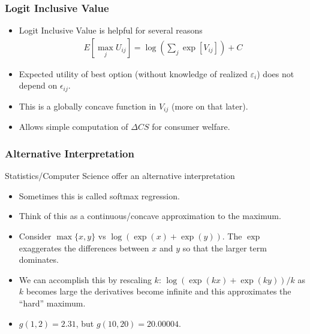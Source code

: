 \documentclass[xcolor=pdftex,dvipsnames,table,mathserif]{beamer}
\begin{document}
\begin{frame}
\frametitle{Logit Inclusive Value}
\begin{itemize}
\item Logit Inclusive Value is helpful for several reasons
\begin{eqnarray*}
E[\max_j U_{ij}] = \log \left(\sum_j \exp[V_{ij}] \right) + C
\end{eqnarray*}
\item Expected utility of best option (without knowledge of realized $\varepsilon_i$) does not depend on $\epsilon_{ij}$.
\item This is a globally concave function in $V_{ij}$ (more on that later).
\item Allows simple computation of $\Delta CS$ for consumer welfare.
\end{itemize}
\end{frame}

\begin{frame}
\frametitle{Alternative Interpretation}
Statistics/Computer Science offer an alternative interpretation
\begin{itemize}
\item Sometimes this is called \alert{softmax} regression.
\item Think of this as a continuous/concave approximation to the maximum.
\item Consider $\max\{x,y\}$ vs $\log(\exp(x) + \exp(y))$. The $\exp$ exaggerates the differences between $x$ and $y$ so that the larger term dominates.
\item We can accomplish this by rescaling $k$:  $\log(\exp(kx) + \exp(ky))/k$ as $k$ becomes large the derivatives become infinite and this approximates the ``hard'' maximum.
\item $g(1, 2) = 2.31$, but $g(10, 20) = 20.00004$.
\end{itemize}
\end{frame}
\end{document}
